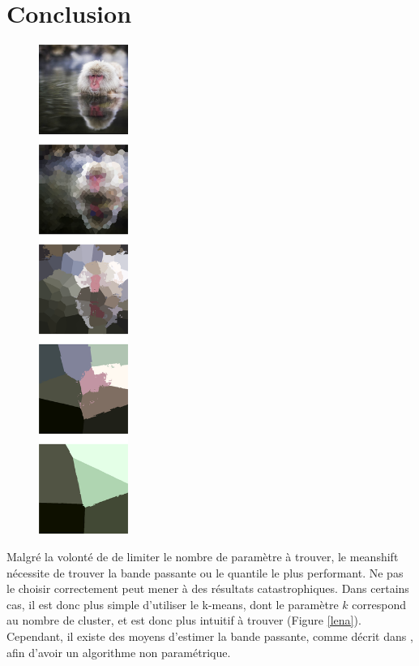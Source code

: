 \documentclass{article}
\begin{document}
\newpage
\section{Conclusion}

\begin{figure}
\includegraphics[width=110px]{images/white_baboon.png}
\end{figure}

Malgré la volonté de \cite{my_article} de limiter le nombre de paramètre à
trouver, le meanshift nécessite de trouver la bande passante ou le quantile le
plus performant. Ne pas le choisir correctement peut mener à des résultats
catastrophiques. Dans certains cas, il est donc plus simple d'utiliser le
k-means, dont le paramètre $k$ correspond au nombre de cluster, et est donc
plus intuitif à trouver (Figure \ref{lena}). \\
Cependant, il existe des moyens d'estimer la bande passante, comme décrit dans
\cite{fastnonparametric}, afin d'avoir un algorithme non paramétrique.


\end{document}
